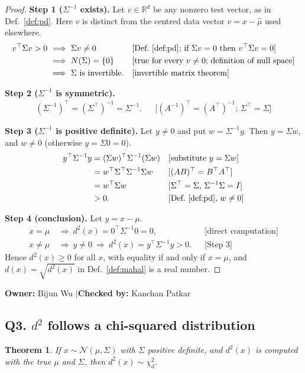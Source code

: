 \documentclass[11pt]{article}
\newtheorem{theorem}{Theorem}[section]
\theoremstyle{definition}
\newcommand{\R}{\mathbb{R}}
\newcommand{\T}{^{\top}}
\newcommand{\rul}[1]{\text{[#1]}}
\newcommand{\owner}[2]{\par\medskip\noindent\textbf{Owner:} #1 \quad$|$\quad \textbf{Checked by:} #2\par\medskip}
\begin{document}
\begin{proof}
\textbf{Step 1 ($\Sigma^{-1}$ exists).} Let $v\in\R^d$ be any nonzero test vector, as in Def.~\ref{def:pd}. Here $v$ is distinct from the centred data vector $v=x-\hat\mu$ used elsewhere.
\begin{align*}
v\T\Sigma v>0 \ &\Longrightarrow\ \Sigma v\neq0 && \rul{Def.~\ref{def:pd}; if $\Sigma v=0$ then $v\T\Sigma v=0$}\\
&\Longrightarrow\ N(\Sigma)=\{0\} && \rul{true for every $v\neq0$; definition of null space}\\
&\Longrightarrow\ \Sigma\text{ is invertible.} && \rul{invertible matrix theorem}
\end{align*}

\textbf{Step 2 ($\Sigma^{-1}$ is symmetric).}
\begin{align*}
(\Sigma^{-1})\T=(\Sigma\T)^{-1}=\Sigma^{-1}. && \rul{$(A^{-1})\T=(A\T)^{-1}$; $\Sigma\T=\Sigma$}
\end{align*}

\textbf{Step 3 ($\Sigma^{-1}$ is positive definite).} Let $y\neq0$ and put $w=\Sigma^{-1}y$. Then $y=\Sigma w$, and $w\neq0$ (otherwise $y=\Sigma0=0$).
\begin{align*}
y\T\Sigma^{-1}y &= (\Sigma w)\T\Sigma^{-1}(\Sigma w) && \rul{substitute $y=\Sigma w$}\\
&= w\T\Sigma\T\Sigma^{-1}\Sigma w && \rul{$(AB)\T=B\T A\T$}\\
&= w\T\Sigma w && \rul{$\Sigma\T=\Sigma$, $\Sigma^{-1}\Sigma=I$}\\
&> 0. && \rul{Def.~\ref{def:pd}, $w\neq0$}
\end{align*}

\textbf{Step 4 (conclusion).} Let $y=x-\mu$.
\begin{align*}
x=\mu \ &\Longrightarrow\ d^2(x)=0\T\Sigma^{-1}0=0, && \rul{direct computation}\\
x\neq\mu \ &\Longrightarrow\ y\neq0\ \Longrightarrow\ d^2(x)=y\T\Sigma^{-1}y>0. && \rul{Step 3}
\end{align*}
Hence $d^2(x)\ge0$ for all $x$, with equality if and only if $x=\mu$, and $d(x)=\sqrt{d^2(x)}$ in Def.~\ref{def:mahal} is a real number.
\end{proof}
\owner{Bijun Wu}{Kanchan Patkar}

\subsection*{Q3. $d^2$ follows a chi-squared distribution}
\begin{theorem}\label{thm:chi2}
If $x\sim\mathcal N(\mu,\Sigma)$ with $\Sigma$ positive definite, and $d^2(x)$ is computed with the true $\mu$ and $\Sigma$, then $d^2(x)\sim\chi^2_d$.
\end{theorem}
\end{document}
